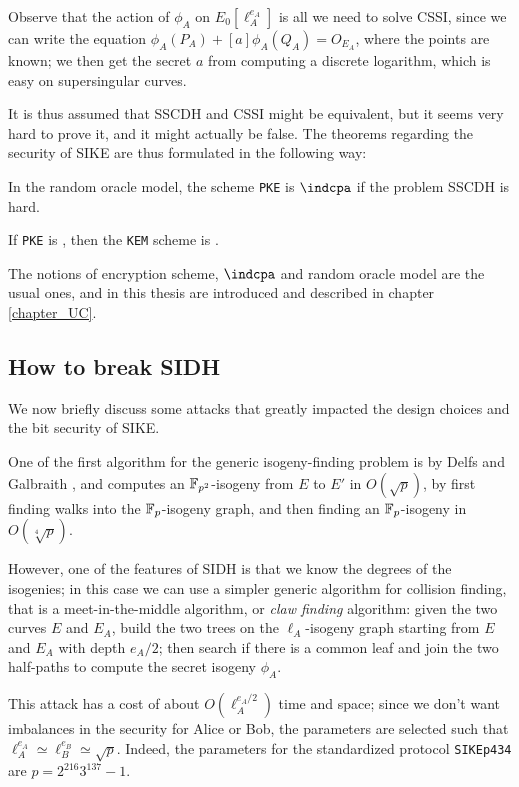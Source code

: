 Observe that the action of $\phi_A$ on $E_0[\ell_A^{e_A}]$ is all we need to solve CSSI, since we can write the equation $\phi_A(P_A)+[a]\phi_A(Q_A)=O_{E_A}$, where the points are known; we then get the secret $a$ from computing a discrete logarithm, which is easy on supersingular curves.

It is thus assumed that SSCDH and CSSI might be equivalent, but it seems very hard to prove it, and it might actually be false. The theorems regarding the security of SIKE are thus formulated in the following way:

\begin{theorem}
    In the random oracle model, the scheme \texttt{PKE} is $\indcpa$ if the problem SSCDH is hard.
\end{theorem}

\begin{theorem}
    If \texttt{PKE} is \indcpa, then the \texttt{KEM} scheme is \indcca.
\end{theorem}

The notions of encryption scheme, $\indcpa$ and random oracle model are the usual ones, and in this thesis are introduced and described in chapter \ref{chapter_UC}.

\subsection{How to break SIDH}
We now briefly discuss some attacks that greatly impacted the design choices and the bit security of SIKE.

One of the first algorithm for the generic isogeny-finding problem is by Delfs and Galbraith \cite{Delfs_Galbraith}, and computes an $\mathbb{F}_{p^2}$-isogeny from $E$ to $E'$ in $O(\sqrt p)$, by first finding walks into the $\mathbb{F}_p$-isogeny graph, and then finding an $\mathbb{F}_p$-isogeny in $O(\sqrt[4]p)$.

However, one of the features of SIDH is that we know the degrees of the isogenies; in this case we can use a simpler generic algorithm for collision finding, that is a meet-in-the-middle algorithm, or \emph{claw finding} algorithm: given the two curves $E$ and $E_A$, build the two trees on the $\ell_A$-isogeny graph starting from $E$ and $E_A$ with depth $e_A/2$; then search if there is a common leaf and join the two half-paths to compute the secret isogeny $\phi_A$.

This attack has a cost of about $O(\ell_A^{e_A/2})$ time and space; since we don't want imbalances in the security for Alice or Bob, the parameters are selected such that $\ell_A^{e_A}\simeq \ell_B^{e_B}\simeq \sqrt{p}$. Indeed, the parameters for the standardized protocol \texttt{SIKEp434} are $p=2^{216}3^{137}-1$.

